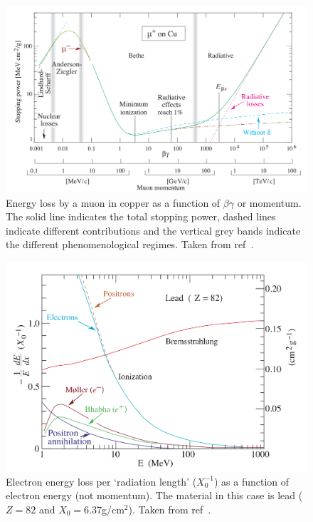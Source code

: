 \begin{figure}[hptb] 
  \centering
    \includegraphics[width=.9\textwidth]{images/mu-pi-bethe.png}
  \caption{Energy loss by a muon in copper as a function of \( \beta \gamma \) or momentum. The solid line indicates the total stopping power, dashed lines indicate different contributions and the vertical grey bands indicate the different phenomenological regimes. Taken from ref~\cite{pdg}.}
  \label{fig:mu-pi-bethe}
\end{figure}
\begin{figure}[hptb]
  \centering  
    \includegraphics[width=.9\textwidth]{images/electron_energy_loss.png}
  \caption{Electron energy loss per `radiation length' (\( X_0^{-1} \)) as a function of electron energy (not momentum). The material in this case is lead (\(Z=82\) and \(X_0 = 6.37\)g/cm\(^2\)). Taken from ref~\cite{pdg}.}
  \label{fig:electron_energy_loss}
\end{figure}

